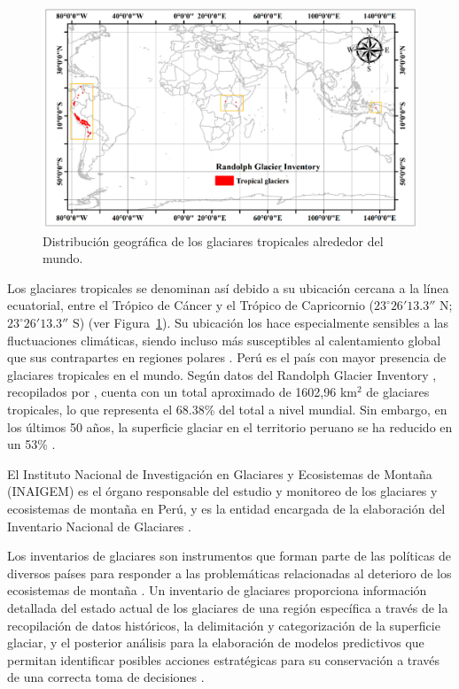 \begin{figure}[H]
    \begin{center}
    \includegraphics[width=1\textwidth]{Images/GlaciaresTropicales.png}
    \end{center}
    \caption{Distribución geográfica de los glaciares tropicales alrededor del mundo.}
    \label{fig:GlaciaresTropicales}
\end{figure}

Los glaciares tropicales se denominan así debido a su ubicación cercana a la línea ecuatorial, entre el Trópico de Cáncer y el Trópico de Capricornio ($23^\circ 26'13.3'' \text{ N}$; $23^\circ 26'13.3'' \text{ S}$) (ver Figura~\ref{fig:GlaciaresTropicales}). Su ubicación los hace especialmente sensibles a las fluctuaciones climáticas, siendo incluso más susceptibles al calentamiento global que sus contrapartes en regiones polares \cite{dussaillant2019two}. Perú es el país con mayor presencia de glaciares tropicales en el mundo. Según datos del Randolph Glacier Inventory \cite{pfeffer2014randolph}, recopilados por \cite{veettil2019global}, cuenta con un total aproximado de 1602,96 km$^2$ de glaciares tropicales, lo que representa el 68.38\% del total a nivel mundial. Sin embargo, en los últimos 50 años, la superficie glaciar en el territorio peruano se ha reducido en un 53\% \cite{reserva2021}.

El Instituto Nacional de Investigación en Glaciares y Ecosistemas de Montaña (INAIGEM) es el órgano responsable del estudio y monitoreo de los glaciares y ecosistemas de montaña en Perú, y es la entidad encargada de la elaboración del Inventario Nacional de Glaciares \cite{inaigem2018inventario}.

Los inventarios de glaciares son instrumentos que forman parte de las políticas de diversos países para responder a las problemáticas relacionadas al deterioro de los ecosistemas de montaña \cite{barella2022combined}. Un inventario de glaciares proporciona información detallada del estado actual de los glaciares de una región específica a través de la recopilación de datos históricos, la delimitación y categorización de la superficie glaciar, y el posterior análisis para la elaboración de modelos predictivos que permitan identificar posibles acciones estratégicas para su conservación a través de una correcta toma de decisiones \cite{barcaza2017glacier}.

